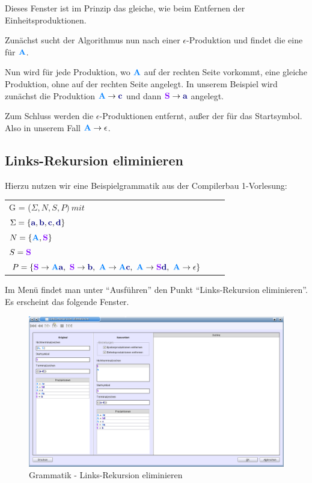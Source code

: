 Dieses Fenster ist im Prinzip das gleiche, wie beim Entfernen der Einheitsproduktionen.

Zunächst sucht der Algorithmus nun nach einer $\epsilon$-Produktion und findet die eine für $\NonterminalSymbol{A}$.

Nun wird für jede Produktion, wo $\NonterminalSymbol{A}$ auf der rechten Seite vorkommt, eine gleiche Produktion, ohne  auf der rechten Seite angelegt. In unserem Beispiel wird zunächst die Produktion $\NonterminalSymbol{A} \to \TerminalSymbol{c}$ und dann $\StartSymbol{S} \to \TerminalSymbol{a}$ angelegt.

Zum Schluss werden die $\epsilon$-Produktionen entfernt, außer der für das Startsymbol. Also in unserem Fall $\NonterminalSymbol{A} \to \epsilon$.


\subsection{Links-Rekursion eliminieren}

Hierzu nutzen wir eine Beispielgrammatik aus der Compilerbau 1-Vorlesung:

\begin{tabular}{lcr}
G = ($\Sigma, N, S, P )\ mit $\\
$\Sigma = \{\TerminalSymbol{a}, \TerminalSymbol{b}, \TerminalSymbol{c},
\TerminalSymbol{d}\}$\\ $N =
\{\NonterminalSymbol{A}, \StartSymbol{S}\}$\\ $S=\StartSymbol{S}$\\
$P = \{\StartSymbol{S} \to \NonterminalSymbol{A}\TerminalSymbol{a},\ \StartSymbol{S} \to \TerminalSymbol{b},\
\NonterminalSymbol{A}	\to \NonterminalSymbol{A}\TerminalSymbol{c},\ \NonterminalSymbol{A} \to \StartSymbol{S}\TerminalSymbol{d},\
\NonterminalSymbol{A} \to \epsilon\}$\\
\end{tabular}

Im Menü findet man unter "`Ausführen"' den Punkt "`Links-Rekursion eliminieren"'. Es erscheint das folgende Fenster.

\begin{figure}[h]
\begin{center}
\includegraphics[width=12cm]{../images/left_recursion.png}
\caption{Grammatik - Links-Rekursion eliminieren}
\end{center}
\end{figure}

